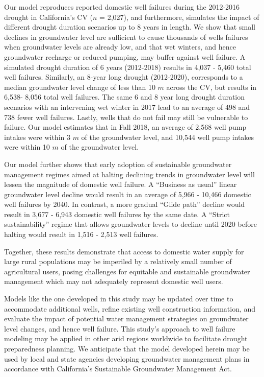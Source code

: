 Our model reproduces reported domestic well failures during the 2012-2016 drought in California's CV ($n$ = 2,027), and furthermore, simulates the impact of different drought duration scenarios up to 8 years in length. We show that small declines in groundwater level are sufficient to cause thousands of wells failures when groundwater levels are already low, and that wet winters, and hence groundwater recharge or reduced pumping, may buffer against well failure. A simulated drought duration of 6 years (2012-2018) results in 4,037 - 5,460 total well failures. Similarly, an 8-year long drought (2012-2020), corresponds to a median groundwater level change of less than 10 $m$ across the CV, but results in 6,538- 8,056 total well failures. The same 6 and 8 year long drought duration scenarios with an intervening wet winter in 2017 lead to an average of 498 and 738 fewer well failures. Lastly, wells that do not fail may still be vulnerable to failure. Our model estimates that in Fall 2018, an average of 2,568 well pump intakes were within 3 $m$ of the groundwater level, and 10,544 well pump intakes were within 10 $m$ of the groundwater level. 

Our model further shows that early adoption of sustainable groundwater management regimes aimed at halting declining trends in groundwater level will lessen the magnitude of domestic well failure. A ``Business as usual'' linear groundwater level decline would result in an average of 5,966 - 10,466 domestic well failures by 2040. In contrast, a more gradual ``Glide path'' decline would result in 3,677 - 6,943 domestic well failures by the same date. A ``Strict sustainability'' regime that allows groundwater levels to decline until 2020 before halting would result in 1,516 - 2,513 well failures.  

Together, these results demonstrate that access to domestic water supply for large rural populations may be imperiled by a relatively small number of agricultural users, posing challenges for equitable and sustainable groundwater management which may not adequately represent domestic well users. 

Models like the one developed in this study may be updated over time to accommodate additional wells, refine existing well construction information, and evaluate the impact of potential water management strategies on groundwater level changes, and hence well failure. This study's approach to well failure modeling may be applied in other arid regions worldwide to facilitate drought preparedness planning. We anticipate that the model developed herein may be used by local and state agencies developing groundwater management plans in accordance with California's Sustainable Groundwater Management Act.  

\clearpage
